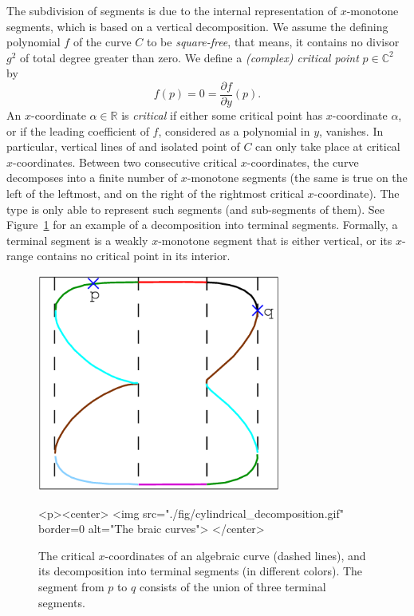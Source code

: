 \begin{ccAdvanced}
The subdivision of segments is due to the internal representation of 
$x$-monotone segments, which is based on a vertical decomposition.
We assume the defining polynomial $f$ of the curve $C$
to be \emph{square-free}, that means, it contains no divisor $g^2$ of total
degree greater than zero. We define a \emph{(complex) critical point}
$p\in\mathbb{C}^2$ by
%
$$f(p)=0=\frac{\partial f}{\partial y}(p).$$
%
An $x$-coordinate $\alpha\in\mathbb{R}$ is \emph{critical}
if either some critical point has $x$-coordinate $\alpha$,
or if the leading coefficient of $f$, considered as a polynomial in $y$,
vanishes. In particular, vertical lines of and isolated point of $C$
can only take place at critical $x$-coordinates.
Between two consecutive critical $x$-coordinates, the curve decomposes
into a finite number of $x$-monotone segments (the same is true on the left
of the leftmost, and on the right of the rightmost critical $x$-coordinate).
The type  is only able to represent such segments
(and sub-segments of them). See Figure~\ref{arr_fig:cylindrical_decomposition} 
for an example of a decomposition into terminal segments. Formally, 
a terminal segment is a weakly $x$-monotone segment that is either vertical, or
its $x$-range contains no critical point in its interior.

\end{ccAdvanced}

\begin{figure}[t]
\begin{ccTexOnly}
 \begin{center}
 \includegraphics[width=8cm]{Arrangement_on_surface_2/fig/cylindrical_decomposition}
 \end{center}
\end{ccTexOnly}
\begin{ccHtmlOnly}
 <p><center>
 <img src="./fig/cylindrical_decomposition.gif" border=0 alt="The braic curves">
 </center>
\end{ccHtmlOnly}
\caption{The critical $x$-coordinates of an algebraic curve (dashed lines),
         and its decomposition into terminal segments (in different colors).
         The segment from $p$ to $q$ consists of the union of 
         three terminal segments.
         \label{arr_fig:cylindrical_decomposition}}
\end{figure}

